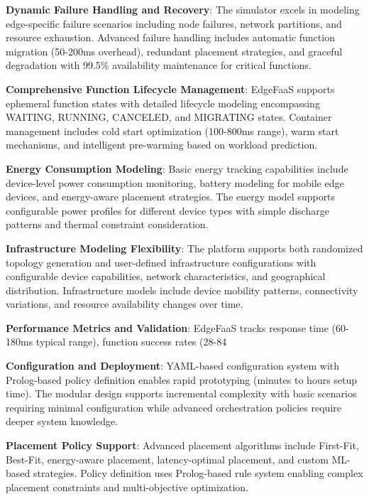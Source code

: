 \textbf{Dynamic Failure Handling and Recovery}: The simulator excels in modeling edge-specific failure scenarios including node failures, network partitions, and resource exhaustion. Advanced failure handling includes automatic function migration (50-200ms overhead), redundant placement strategies, and graceful degradation with 99.5\% availability maintenance for critical functions.

\textbf{Comprehensive Function Lifecycle Management}: EdgeFaaS supports ephemeral function states with detailed lifecycle modeling encompassing WAITING, RUNNING, CANCELED, and MIGRATING states. Container management includes cold start optimization (100-800ms range), warm start mechanisms, and intelligent pre-warming based on workload prediction.

\textbf{Energy Consumption Modeling}: Basic energy tracking capabilities include device-level power consumption monitoring, battery modeling for mobile edge devices, and energy-aware placement strategies. The energy model supports configurable power profiles for different device types with simple discharge patterns and thermal constraint consideration.

\textbf{Infrastructure Modeling Flexibility}: The platform supports both randomized topology generation and user-defined infrastructure configurations with configurable device capabilities, network characteristics, and geographical distribution. Infrastructure models include device mobility patterns, connectivity variations, and resource availability changes over time.

\textbf{Performance Metrics and Validation}: EdgeFaaS tracks response time (60-180ms typical range), function success rates (28-84%

\textbf{Configuration and Deployment}: YAML-based configuration system with Prolog-based policy definition enables rapid prototyping (minutes to hours setup time). The modular design supports incremental complexity with basic scenarios requiring minimal configuration while advanced orchestration policies require deeper system knowledge.

\textbf{Placement Policy Support}: Advanced placement algorithms include First-Fit, Best-Fit, energy-aware placement, latency-optimal placement, and custom ML-based strategies. Policy definition uses Prolog-based rule system enabling complex placement constraints and multi-objective optimization.

